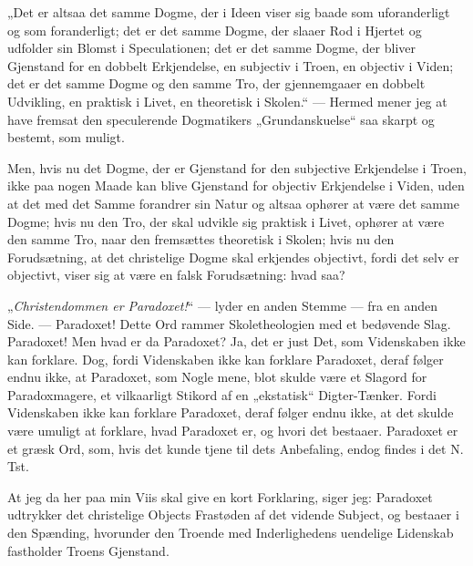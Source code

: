 \documentclass[12pt,a4paper]{book}
\newcommand{\opage}[1]{\marginnote{\footnotesize\textit{[#1]}}}
\begin{document}
„Det er altsaa det samme Dogme, der i Ideen viser sig baade som uforanderligt
og som foranderligt; det er det samme Dogme, der slaaer Rod i Hjertet og
udfolder sin Blomst i Speculationen; det er det samme Dogme, der bliver
Gjenstand for en dobbelt Erkjendelse, en subjectiv i Troen, en objectiv i
Viden; det er det samme Dogme og den samme Tro, der gjennemgaaer en dobbelt
Udvikling, en praktisk i Livet, en theoretisk i Skolen.“ --- Hermed mener jeg
at have fremsat den speculerende Dogmatikers „Grundanskuelse“ saa skarpt og
bestemt, som muligt.

Men, hvis nu det Dogme, der er Gjenstand for den subjective Erkjendelse i
Troen, ikke paa nogen Maade kan blive Gjenstand for objectiv Erkjendelse i
Viden, uden at det med det Samme forandrer sin Natur og altsaa ophører at være
det samme Dogme; hvis nu den Tro, der skal udvikle sig praktisk i Livet,
ophører at være den samme Tro, naar den fremsættes theoretisk i Skolen; hvis nu
den Forudsætning, at det christelige Dogme
\opage{124} skal erkjendes objectivt, fordi det selv er objectivt, viser sig at være en
falsk Forudsætning: hvad saa?

„\emph{Christendommen er Paradoxet!}“ --- lyder en anden Stemme --- fra en
anden Side. --- Paradoxet! Dette Ord rammer Skoletheologien med et bedøvende
Slag. Paradoxet! Men hvad er da Paradoxet? Ja, det er just Det, som Videnskaben
ikke kan forklare. Dog, fordi Videnskaben ikke kan forklare Paradoxet, deraf
følger endnu ikke, at Paradoxet, som Nogle mene, blot skulde være et Slagord
for Paradoxmagere, et vilkaarligt Stikord af en „ekstatisk“ Digter-Tænker.
Fordi Videnskaben ikke kan forklare Paradoxet, deraf følger endnu ikke, at det
skulde være umuligt at forklare, hvad Paradoxet er, og hvori det bestaaer.
Paradoxet er et græsk Ord, som, hvis det kunde tjene til dets Anbefaling, endog
findes i det N. Tst.

At jeg da her paa min Viis skal give en kort Forklaring, siger jeg: Paradoxet
udtrykker det christelige Objects Frastøden af det vidende Subject, og bestaaer
i den Spænding, hvorunder den Troende med Inderlighedens uendelige Lidenskab
fastholder Troens Gjenstand.
\end{document}
